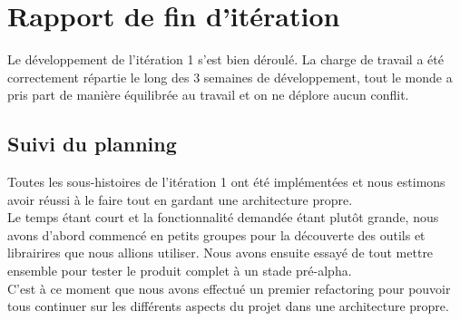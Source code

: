 \section{Rapport de fin d'itération}

Le développement de l'itération 1 s'est bien déroulé. La charge de travail a 
été correctement répartie le long des 3 semaines de développement, tout le monde
a pris part de manière équilibrée au travail et on ne déplore aucun conflit.\\

\subsection{Suivi du planning}

Toutes les sous-histoires de l'itération 1 ont été implémentées et nous estimons
avoir réussi à le faire tout en gardant une architecture propre.\\

Le temps étant court et la fonctionnalité demandée étant plutôt grande, nous 
avons d'abord commencé en petits groupes pour la découverte des outils et
librairires que nous allions utiliser. Nous avons ensuite essayé de tout mettre
ensemble pour tester le produit complet à un stade pré-alpha.\\

C'est à ce moment que nous avons effectué un premier refactoring pour pouvoir
tous continuer sur les différents aspects du projet dans une architecture propre.

